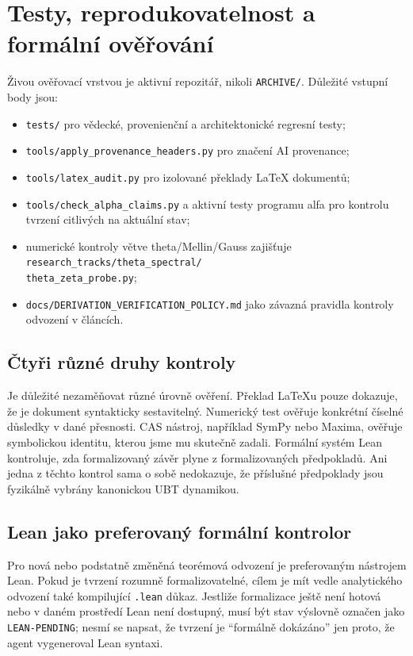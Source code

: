 
\chapter{Testy, reprodukovatelnost a formální ověřování}
\label{ch:tests-repro}

Živou ověřovací vrstvou je aktivní repozitář, nikoli \texttt{ARCHIVE/}.
Důležité vstupní body jsou:
\begin{itemize}
 \item \texttt{tests/} pro vědecké, provenienční a architektonické regresní testy;
 \item \texttt{tools/apply\_provenance\_headers.py} pro značení AI provenance;
 \item \texttt{tools/latex\_audit.py} pro izolované překlady LaTeX dokumentů;
 \item \texttt{tools/check\_alpha\_claims.py} a aktivní testy programu alfa pro
       kontrolu tvrzení citlivých na aktuální stav;
 \item numerické kontroly větve theta/Mellin/Gauss zajišťuje\\
       \texttt{research\_tracks/theta\_spectral/}\\
       \texttt{theta\_zeta\_probe.py};
 \item \texttt{docs/DERIVATION\_VERIFICATION\_POLICY.md} jako závazná pravidla
       kontroly odvození v článcích.
\end{itemize}

\section{Čtyři různé druhy kontroly}
Je důležité nezaměňovat různé úrovně ověření. Překlad LaTeXu pouze dokazuje,
že je dokument syntakticky sestavitelný. Numerický test ověřuje konkrétní
číselné důsledky v dané přesnosti. CAS nástroj, například SymPy nebo Maxima,
ověřuje symbolickou identitu, kterou jsme mu skutečně zadali. Formální systém
Lean kontroluje, zda formalizovaný závěr plyne z formalizovaných předpokladů.
Ani jedna z těchto kontrol sama o sobě nedokazuje, že příslušné předpoklady jsou
fyzikálně vybrány kanonickou UBT dynamikou.

\section{Lean jako preferovaný formální kontrolor}
Pro nová nebo podstatně změněná teorémová odvození je preferovaným nástrojem
Lean. Pokud je tvrzení rozumně formalizovatelné, cílem je mít vedle analytického
odvození také kompilující \texttt{.lean} důkaz. Jestliže formalizace ještě není
hotová nebo v daném prostředí Lean není dostupný, musí být stav výslovně
označen jako \texttt{LEAN-PENDING}; nesmí se napsat, že tvrzení je ``formálně
dokázáno'' jen proto, že agent vygeneroval Lean syntaxi.


